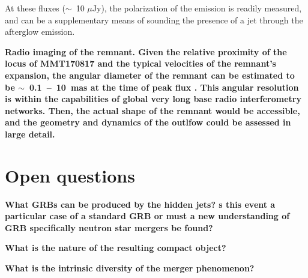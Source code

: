 At these fluxes ($\sim$~10 $\mu$Jy), the polarization of the emission is readily measured, and can be a supplementary means of sounding the presence of a jet through the afterglow emission.

\bf{Radio imaging of the remnant.} Given the relative proximity of the locus of MMT170817 and the typical velocities of the remnant's expansion, the angular diameter of the remnant can be estimated to be $\sim$~0.1~--~10~mas at the time of peak flux \cite{7}. This angular resolution is within the capabilities of global very long base radio interferometry networks. Then, the actual shape of the remnant would be accessible, and the geometry and dynamics of the outlfow could be assessed in large detail.

\section{Open questions}

\bf{What GRBs can be produced by the hidden jets? }s this event a particular case of a standard GRB or must a new understanding of GRB specifically neutron star mergers be found? 

\bf{What is the nature of the resulting compact object? }


\bf{What is the intrinsic diversity of the merger phenomenon? }